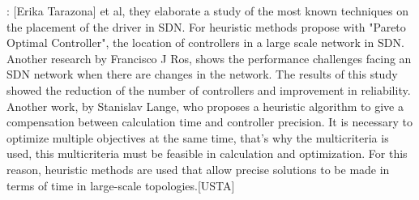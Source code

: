 \documentclass[a4paper,10pt]{article}
\begin{document}



\cite{TaAl17}: [Erika Tarazona] et al, they elaborate a study of the most known techniques on the placement of the driver in SDN.
For heuristic methods propose with "Pareto Optimal Controller", the location of controllers in a large scale network in SDN.
Another research by Francisco J Ros, shows the performance challenges facing an SDN network when there are changes in the network. The results of this study showed the reduction of the number of controllers and improvement in reliability.
Another work, by Stanislav Lange, who proposes a heuristic algorithm to give a compensation between calculation time and controller precision.
It is necessary to optimize multiple objectives at the same time, that's why the multicriteria is used, this multicriteria must be feasible in calculation and optimization. For this reason, heuristic methods are used that allow precise solutions to be made in terms of time in large-scale topologies.[USTA]
\end{document}
